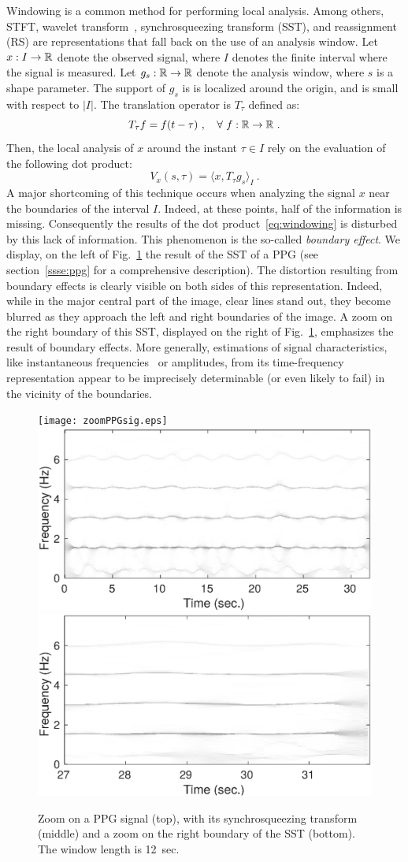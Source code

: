 \documentclass[journal]{IEEEtran}
\begin{document}
Windowing is a common method for performing local analysis. Among others, STFT, wavelet transform~\cite{Mallat99wavelet}, synchrosqueezing transform (SST), and reassignment~\cite{Auger13time} (RS) are representations that fall back on the use of an analysis window. Let $x:I\to{\mathbb R}$ denote the observed signal, where $I$ denotes the finite interval where the signal is measured. Let $g_s:{\mathbb R}\to{\mathbb R}$ denote the analysis window, where $s$ is a shape parameter. The support of $g_s$ is is localized around the origin, and is small with respect to $|I|$. The translation operator is $T_\tau$ defined as:
\[
T_\tau f = f(t-\tau)\ ,\quad \forall\ f:{\mathbb R}\to{\mathbb R}\ .
\]
Then, the local analysis of $x$ around the instant $\tau\in I$ rely on the evaluation of the following dot product:
\begin{equation}
V_x(s,\tau) = \langle x, T_\tau g_s \rangle_I \ .
\label{eq:windowing}
\end{equation}
A major shortcoming of this technique occurs when analyzing the signal $x$ near the boundaries of the interval $I$. Indeed, at these points, half of the information is missing. Consequently the results of the dot product~\ref{eq:windowing} is disturbed by this lack of information. This phenomenon is the so-called \emph{boundary effect}. We display, on the left of Fig.~\ref{fig:ex.intro} the result of the SST of a PPG (see section~\ref{ssse:ppg} for a comprehensive description). The distortion resulting from boundary effects is clearly visible on both sides of this representation. Indeed, while in the major central part of the image, clear lines stand out, they become blurred as they approach the left and right boundaries of the image. A zoom on the right boundary of this SST, displayed on the right of Fig.~\ref{fig:ex.intro}, emphasizes the result of boundary effects. More generally, estimations of signal characteristics, like instantaneous frequencies~\cite{Delprat92asymptotic} or amplitudes, from its time-frequency representation appear to be imprecisely determinable (or even likely to fail) in the vicinity of the boundaries.

\begin{figure}
\centering
\texttt{[image: zoomPPGsig.eps]}
\includegraphics[width=.48\textwidth]{SSTintro.eps}
\includegraphics[width=.48\textwidth]{zoomSSTintro.eps}
\caption{Zoom on a PPG signal (top), with its synchrosqueezing transform (middle) and a zoom on the right boundary of the SST (bottom). The window length is 12~sec. }
\label{fig:ex.intro}
\end{figure}
\end{document}
